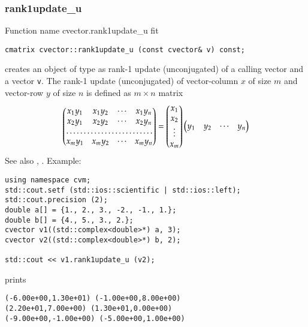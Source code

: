\subsubsection{rank1update\_u}
Function%
\pdfdest name {cvector.rank1update_u} fit
\begin{verbatim}
cmatrix cvector::rank1update_u (const cvector& v) const;
\end{verbatim}
creates an object of type 
as  rank-1 update (unconjugated) of
a calling vector and a vector \verb"v".
The rank-1 update (unconjugated)
of  vector-column $x$ of  size $m$ and
 vector-row $y$ of  size $n$ is defined as $m\times n$ matrix
\begin{equation*}
\begin{pmatrix}
x_1 y_1 & x_1 y_2 & \cdots & x_1 y_n \\
x_2 y_1 & x_2 y_2 & \cdots & x_2 y_n \\
\hdotsfor{4} \\
x_m y_1 & x_m y_2 & \cdots & x_m y_n
\end{pmatrix} =
\begin{pmatrix}
x_1 \\
x_2 \\
\vdots \\
x_m
\end{pmatrix}
\begin{pmatrix}
y_1 & y_2 & \cdots & y_n
\end{pmatrix}
\end{equation*}
See also , .
Example:
\begin{Verbatim}
using namespace cvm;
std::cout.setf (std::ios::scientific | std::ios::left);
std::cout.precision (2);
double a[] = {1., 2., 3., -2., -1., 1.};
double b[] = {4., 5., 3., 2.};
cvector v1((std::complex<double>*) a, 3);
cvector v2((std::complex<double>*) b, 2);

std::cout << v1.rank1update_u (v2);
\end{Verbatim}
prints
\begin{Verbatim}
(-6.00e+00,1.30e+01) (-1.00e+00,8.00e+00)
(2.20e+01,7.00e+00) (1.30e+01,0.00e+00)
(-9.00e+00,-1.00e+00) (-5.00e+00,1.00e+00)
\end{Verbatim}
\newpage



